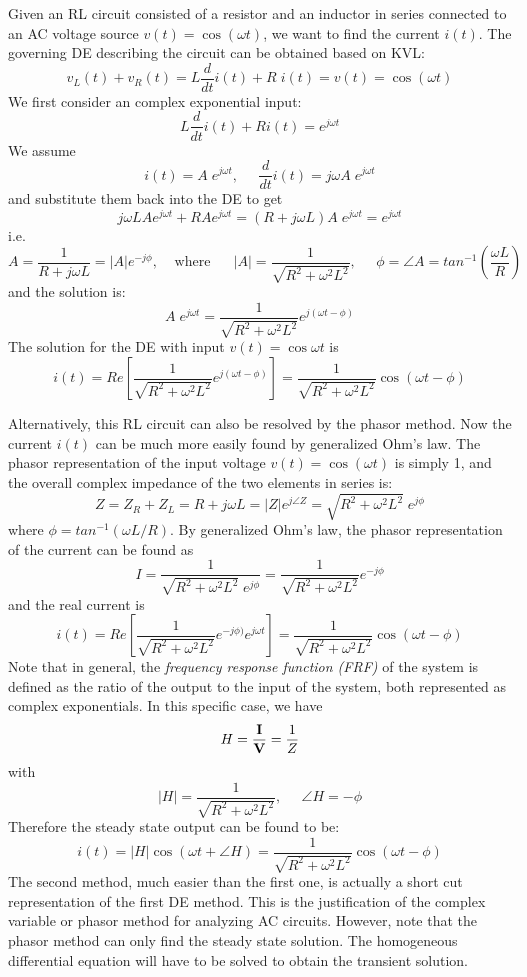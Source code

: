 Given an RL circuit consisted of a resistor and an inductor in 
series connected to an AC voltage source $v(t)=\cos(\omega t)$, we
want to find the current $i(t)$. The governing DE describing the 
circuit can be obtained based on KVL:
\[
v_L(t)+v_R(t)=L\frac{d}{dt}i(t)+R\;i(t)=v(t)=\cos(\omega t)
\]
We first consider an complex exponential input:
\[	
L\frac{d}{dt}i(t)+Ri(t)=e^{j\omega t}
\]
We assume
\[ 
i(t)=A\;e^{j\omega t},\;\;\;\;\;\frac{d}{dt}i(t)=j\omega A\;e^{j\omega t} 
\]
and substitute them back into the DE to get
\[
j\omega L A e^{j\omega t}+RA e^{j\omega t}
=(R+j\omega L)A\; e^{j\omega t}=e^{j\omega t} 
\]
i.e.
\[
A=\frac{1}{R+j\omega L}=|A|e^{-j\phi},\;\;\;\;\mbox{where}
\;\;\;\;\;\;|A|=\frac{1}{\sqrt{R^2+\omega^2 L^2}},\;\;\;\;\;
\phi=\angle A=tan^{-1}\left(\frac{\omega L}{R}\right)	
\]
and the solution is:
\[
A\;e^{j\omega t}=\frac{1}{\sqrt{R^2+\omega^2 L^2}} e^{j(\omega t-\phi)} 
\]
The solution for the DE with input $v(t)=\cos \omega t$ is
\[
i(t)=Re\left[\frac{1}{\sqrt{R^2+\omega^2 L^2}} e^{j(\omega t-\phi)}\right]
=\frac{1}{\sqrt{R^2+\omega^2 L^2}} \cos(\omega t-\phi)
\]

Alternatively, this RL circuit can also be resolved by the phasor
method. Now the current $i(t)$ can be much more easily found by 
generalized Ohm's law. The phasor representation of the input voltage 
$v(t)=\cos(\omega t)$ is simply 1, and the overall complex impedance 
of the two elements in series is:
\[
Z=Z_R+Z_L=R+j\omega L=|Z| e^{j\angle Z}=\sqrt{R^2+\omega^2L^2}\;e^{j \phi} 
\]
where $\phi=tan^{-1}(\omega L/R)$. By generalized Ohm's law, 
the phasor representation of the current can be found as
\[
I=\frac{1}{\sqrt{R^2+\omega^2L^2}\;e^{j\phi}}
  =\frac{1}{\sqrt{R^2+\omega^2L^2}} e^{-j\phi}	
\]
and the real current is
\[
i(t)=Re\left[\frac{1}{\sqrt{R^2+\omega^2 L^2}}e^{-j\phi)}e^{j\omega t}\right]
=\frac{1}{\sqrt{R^2+\omega^2 L^2}}\cos(\omega t-\phi)	
\]
Note that in general, the {\em frequency response function (FRF)} of 
the system is defined as the ratio of the output to the input of the
system, both represented as complex exponentials. In this specific case,
we have
\[
H=\frac{{\bf I}}{{\bf V}}=\frac{1}{Z} 
\]
with 
\[
|H|=\frac{1}{\sqrt{R^2+\omega^2L^2}},\;\;\;\;\;\angle H=-\phi 
\]
Therefore the steady state output can be found to be:
\[
i(t)=|H| \cos(\omega t+\angle H)
=\frac{1}{\sqrt{R^2+\omega^2 L^2}}\cos(\omega t-\phi)	
\]
The second method, much easier than the first one, is actually a short 
cut representation of the first DE method. This is the justification of
the complex variable or phasor method for analyzing AC circuits. However,
note that the phasor method can only find the steady state solution. The
homogeneous differential equation will have to be solved to obtain the
transient solution.

